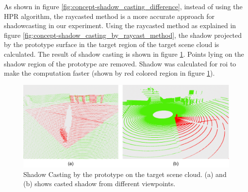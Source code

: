 As shown in figure \ref{fig:concept-shadow_casting_difference}, instead of using the HPR algorithm, the raycasted method is a more accurate approach for shadowcasting in our experiment. Using the raycasted method as explained in figure \ref{fig:concept-shadow_casting_by_raycast_method}, the shadow projected by the prototype surface in the target region of the target scene cloud is calculated. The result of shadow casting is shown in figure \ref{fig:result-shadow_casting_by_prototype}. Points lying on the shadow region of the prototype are removed. Shadow was calculated for \acrshort{roi} to make the computation faster (shown by red colored region in figure \ref{fig:result-shadow_casting_by_prototype}).

\begin{figure}[htbp]
    \centering
    \includegraphics[width=1\linewidth]{97_graphics/results/shadow_casting_by_prototype.pdf}
    \caption{Shadow Casting by the prototype on the target scene cloud. (a) and (b) shows casted shadow from different viewpoints.}
    \label{fig:result-shadow_casting_by_prototype}
\end{figure}







 